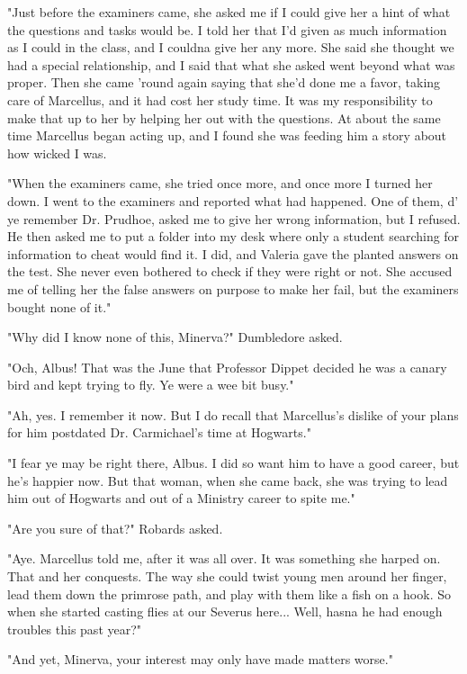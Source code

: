 \documentclass[a4paper,11pt]{article}
\begin{document}
"Just before the examiners came, she asked me if I could give her a hint of what the questions and tasks would be. I told her that I'd given as much information as I could in the class, and I couldna give her any more. She said she thought we had a special relationship, and I said that what she asked went beyond what was proper. Then she came 'round again saying that she'd done me a favor, taking care of Marcellus, and it had cost her study time. It was my responsibility to make that up to her by helping her out with the questions. At about the same time Marcellus began acting up, and I found she was feeding him a story about how wicked I was.

"When the examiners came, she tried once more, and once more I turned her down. I went to the examiners and reported what had happened. One of them, d' ye remember Dr. Prudhoe, asked me to give her wrong information, but I refused. He then asked me to put a folder into my desk where only a student searching for information to cheat would find it. I did, and Valeria gave the planted answers on the test. She never even bothered to check if they were right or not. She accused me of telling her the false answers on purpose to make her fail, but the examiners bought none of it."

"Why did I know none of this, Minerva?" Dumbledore asked.

"Och, Albus! That was the June that Professor Dippet decided he was a canary bird and kept trying to fly. Ye were a wee bit busy."

"Ah, yes. I remember it now. But I do recall that Marcellus's dislike of your plans for him postdated Dr. Carmichael's time at Hogwarts."

"I fear ye may be right there, Albus. I did so want him to have a good career, but he's happier now. But that woman, when she came back, she was trying to lead him out of Hogwarts and out of a Ministry career to spite me."

"Are you sure of that?" Robards asked.

"Aye. Marcellus told me, after it was all over. It was something she harped on. That and her conquests. The way she could twist young men around her finger, lead them down the primrose path, and play with them like a fish on a hook. So when she started casting flies at our Severus here... Well, hasna he had enough troubles this past year?"

"And yet, Minerva, your interest may only have made matters worse."
\end{document}
